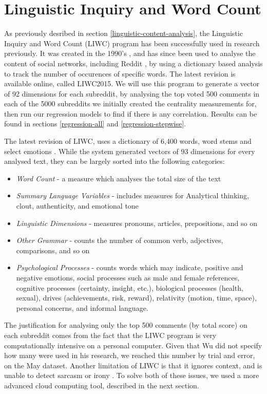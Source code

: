 \documentclass[bsc,frontabs,twoside,singlespacing,parskip,deptreport]{infthesis}
\begin{document}
\section{Linguistic Inquiry and Word Count}\label{liwc}

As previously desribed in section \ref{linguistic-content-analysis}, the Linguistic Inquiry and Word Count (LIWC) program has been successfully used in research previously. It was created in the 1990's \cite{liwc}, and has since been used to analyse the content of social networks, including Reddit \cite{ethayarajhKawin2017TEoP}, by using a dictionary based analysis to track the number of occurences of specific words. The latest revision is available online, called LIWC2015. We will use this program to generate a vector of 92 dimensions for each subreddit, by analysing the top voted 500 comments in each of the 5000 subreddits we initially created the centrality measurements for, then run our regression models to find if there is any correlation. Results can be found in sections \ref{regression-all} and \ref{regression-stepwise}.

The latest revision of LIWC, uses a dictionary of 6,400 words, word stems and select emotions \cite{pennebaker2015}. While the system generated vectors of 93 dimensions for every analysed text, they can be largely sorted into the following categories:

\begin{itemize}
	\item \textit{Word Count} - a measure which analyses the total size of the text
	\item \textit{Summary Language Variables} - includes measures for Analytical thinking, clout, authenticity, and emotional tone 
	\item \textit{Linguistic Dimensions} - measures pronouns, articles, prepositions, and so on
	\item \textit{Other Grammar} - counts the number of common verb, adjectives, comparisons, and so on
	\item \textit{Psychological Processes} - counts words which may indicate, positive and negative emotions, social processes such as male and female references, cognitive processes (certainty, insight, etc.), biological processes (health, sexual), drives (achievements, risk, reward), relativity (motion, time, space), personal concerns, and informal language.
\end{itemize}

The justification for analysing only the top 500 comments (by total score) on each subreddit comes from the fact that the LIWC program is very computationally intensive on a personal computer. Given that Wu \cite{masters} did not specify how many were used in his research, we reached this number by trial and error, on the May dataset. Another limitation of LIWC is that it ignores context, and is unable to detect sarcasm or irony \cite{liwc}. To solve both of these issues, we used a more advanced cloud computing tool, described in the next section.
\end{document}
